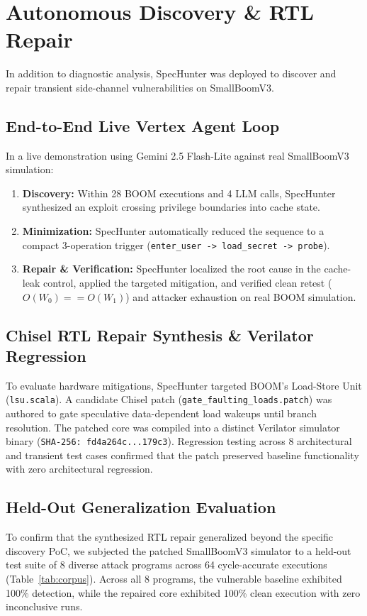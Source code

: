 \documentclass[conference,10pt]{IEEEtran}
\begin{document}
\section{Autonomous Discovery \& RTL Repair}
In addition to diagnostic analysis, SpecHunter was deployed to discover and repair transient side-channel vulnerabilities on SmallBoomV3.

\subsection{End-to-End Live Vertex Agent Loop}
In a live demonstration using Gemini 2.5 Flash-Lite against real SmallBoomV3 simulation:
\begin{enumerate}
    \item \textbf{Discovery:} Within 28 BOOM executions and 4 LLM calls, SpecHunter synthesized an exploit crossing privilege boundaries into cache state.
    \item \textbf{Minimization:} SpecHunter automatically reduced the sequence to a compact 3-operation trigger (\texttt{enter\_user -> load\_secret -> probe}).
    \item \textbf{Repair \& Verification:} SpecHunter localized the root cause in the cache-leak control, applied the targeted mitigation, and verified clean retest ($O(W_0) == O(W_1)$) and attacker exhaustion on real BOOM simulation.
\end{enumerate}

\subsection{Chisel RTL Repair Synthesis \& Verilator Regression}
To evaluate hardware mitigations, SpecHunter targeted BOOM's Load-Store Unit (\texttt{lsu.scala}). A candidate Chisel patch (\texttt{gate\_faulting\_loads.patch}) was authored to gate speculative data-dependent load wakeups until branch resolution. The patched core was compiled into a distinct Verilator simulator binary (\texttt{SHA-256: fd4a264c...179c3}). Regression testing across 8 architectural and transient test cases confirmed that the patch preserved baseline functionality with zero architectural regression.

\subsection{Held-Out Generalization Evaluation}
To confirm that the synthesized RTL repair generalized beyond the specific discovery PoC, we subjected the patched SmallBoomV3 simulator to a held-out test suite of 8 diverse attack programs across 64 cycle-accurate executions (Table~\ref{tab:corpus}). Across all 8 programs, the vulnerable baseline exhibited 100\% detection, while the repaired core exhibited 100\% clean execution with zero inconclusive runs.
\end{document}
